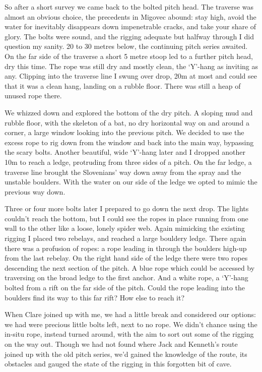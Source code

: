 So after a short survey we came back to the bolted pitch head. The traverse was almost an obvious choice, the precedents in Migovec abound: stay high, avoid the water for inevitably disappears down impenetrable cracks, and take your share of glory. The bolts were sound, and the rigging adequate but halfway through I did question my sanity. 20 to 30 metres below, the continuing pitch series awaited. On the far side of the traverse a short 5 metre stoop led to a further pitch head, dry this time. The rope was still dry and mostly clean, the ‘Y’-hang as inviting as any. Clipping into the traverse line I swung over drop, 20m at most and could see that it was a clean hang, landing on a rubble floor. There was still a heap of unused rope there. 

We whizzed down and explored the bottom of the dry pitch. A sloping mud and rubble floor, with the skeleton of a bat, no dry horizontal way on and around a corner, a large window looking into the previous pitch. We decided to use the excess rope to rig down from the window and back into the main way, bypassing the scary bolts. Another beautiful, wide ‘Y’-hang later and I dropped another 10m to reach a ledge, protruding from three sides of a pitch. On the far ledge, a traverse line brought the Slovenians’ way down away from the spray and the unstable boulders. With the water on our side of the ledge we opted to mimic the previous way down. 



Three or four more bolts later I prepared to go down the next drop. The lights couldn’t reach the bottom, but I could see the ropes in place running from one wall to the other like a loose, lonely spider web. Again mimicking the existing rigging I placed two rebelays, and reached a large bouldery ledge. There again there was a profusion of ropes: a rope leading in through the boulders high-up from the last rebelay. On the right hand side of the ledge there were two ropes descending the next section of the pitch. A blue rope which could be accessed by traversing on the broad ledge to the first anchor. And a white rope, a ‘Y’-hang bolted from a rift on the far side of the pitch. Could the rope leading into the boulders find its way to this far rift?  How else to reach it?

When Clare joined up with me, we had a little break and considered our options: we had were precious little bolts left, next to no rope. We didn’t chance using the in-situ rope, instead turned around, with the aim to sort out some of the rigging on the way out. Though we had not found where Jack and Kenneth’s route joined up with the old pitch series, we’d gained the knowledge of the route, its obstacles and gauged the state of the rigging in this forgotten bit of cave. 

